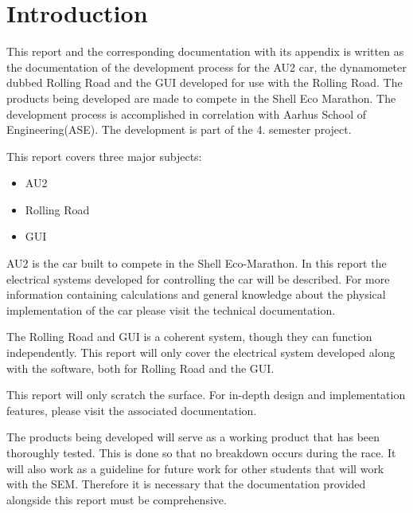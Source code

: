 \chapter{Introduction}
This report and the corresponding documentation with its appendix is written as the documentation of the development process for the AU2 car, the dynamometer dubbed Rolling Road and the GUI developed for use with the Rolling Road. The products being developed are made to compete in the Shell Eco Marathon. The development process is accomplished in correlation with Aarhus School of Engineering(ASE). The development is part of the 4. semester project. 

This report covers three major subjects:

\begin{itemize}
	\item{AU2}
	\item{Rolling Road}
	\item{GUI}
\end{itemize}

AU2 is the car built to compete in the Shell Eco-Marathon. In this report the electrical systems developed for controlling the car will be described. For more information containing calculations and general knowledge about the physical implementation of the car please visit the technical documentation.

The Rolling Road and GUI is a coherent system, though they can function independently. This report will only cover the electrical system developed along with the software, both for Rolling Road and the GUI. 

This report will only scratch the surface. For in-depth design and implementation features, please visit the associated documentation. 

The products being developed will serve as a working product that has been thoroughly tested. This is done so that no breakdown occurs during the race. It will also work as a guideline for future work for other students that will work with the SEM. Therefore it is necessary that the documentation provided alongside this report must be comprehensive.

